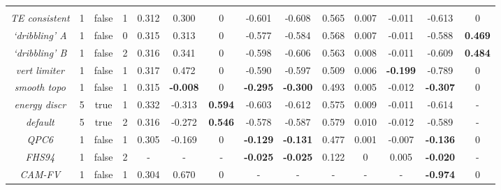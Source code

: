 \documentclass{agujournal}
\begin{document}
\begin{table}
\begin{tabular}{c|ccc|ccc|cccccc|c}
\hline \hline \\
{\em{TE consistent}}& 1 & false & 1 &  0.312&  0.300& 0    & -0.601& -0.608&  0.565& 0.007          & -0.011& -0.613 &  0\\
{\em{`dribbling' A}}& 1 & false & 0 &  0.315&  0.313& 0    & -0.577& -0.584&  0.568& 0.007          & -0.011& -0.588 &  {\bf{0.469}}\\
{\em{`dribbling' B}}& 1 & false & 2 &  0.316&  0.341& 0    & -0.598& -0.606&  0.563& 0.008          & -0.011& -0.609 &  {\bf{0.484}}\\
{\em{vert limiter}} & 1 & false & 1 &  0.317&  0.472& 0    & -0.590& -0.597&  0.509& 0.006          & {\bf{-0.199}} & -0.789 &  0\\
%
%
%
%
{\em{smooth topo}} & 1 & false & 1  &  0.315& {\bf{-0.008}}& 0  & {\bf{-0.295}}& {\bf{-0.300}}  &  0.493& 0.005          & -0.012& {\bf{-0.307}} & 0\\
{\em{energy discr}} & 5 & true  & 1 &  0.332& -0.313& {\bf{0.594}}& -0.603& -0.612&  0.575& 0.009          & -0.011& -0.614 & -\\
{\em{default}}      & 5 & true  & 2 &  0.316& -0.272& {\bf{0.546}}& -0.578& -0.587&  0.579& 0.010          & -0.012& -0.589 & -\\ %
{\em{QPC6}}         & 1 & false & 1 &  0.305& -0.169& 0    &{\bf{-0.129}}& {\bf{-0.131}}&  0.477& 0.001 & -0.007& {\bf{-0.136}} & 0\\
{\em{FHS94}}        & 1 & false & 2 &  -    &   -   &  -   & {\bf{-0.025}}&{\bf{-0.025}} &  0.122& 0 &  0.005 & {\bf{-0.020}} & -\\
{\em{CAM-FV}}       & 1 & false & 1 &  0.304&  0.670& 0    & - & - & - & - & - & {\bf{-0.974}} & 0 
  \end{tabular}
  \end{table}
\end{document}
